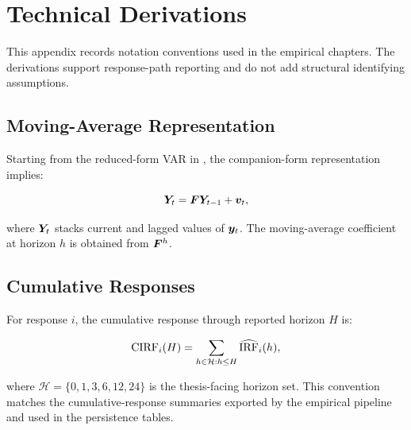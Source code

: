 \section{Technical Derivations}
\label{app:technical-derivations}

This appendix records notation conventions used in the empirical chapters. The derivations support response-path reporting and do not add structural identifying assumptions.

\subsection{Moving-Average Representation}

Starting from the reduced-form VAR in , the companion-form representation implies:

\begin{equation}
  \bm{Y}_t = \bm{F}\bm{Y}_{t-1} + \bm{v}_t,
  \label{eq:companion-form}
\end{equation}

where \(\bm{Y}_t\) stacks current and lagged values of \(\bm{y}_t\). The moving-average coefficient at horizon \(h\) is obtained from \(\bm{F}^h\).

\subsection{Cumulative Responses}

For response \(i\), the cumulative response through reported horizon \(H\) is:

\begin{equation}
  \operatorname{CIRF}_i(H) = \sum_{h \in \mathcal{H}: h \leq H}\widehat{\operatorname{IRF}}_i(h),
  \label{eq:cumulative-irf}
\end{equation}

where \(\mathcal{H}=\{0,1,3,6,12,24\}\) is the thesis-facing horizon set. This convention matches the cumulative-response summaries exported by the empirical pipeline and used in the persistence tables.
